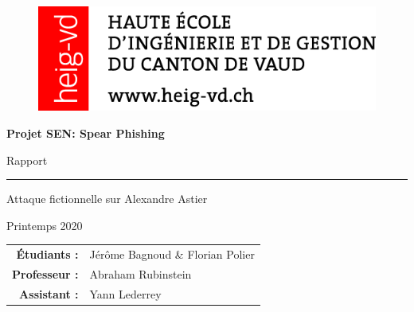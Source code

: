\documentclass{extarticle}
\begin{document}
    
    \begin{titlepage}
        \begin{center}

            \begin{figure}[H]
                \includegraphics[scale=0.7]{images/HEIG-VD_Logo96x29_RVB_ROUGE.png}
            \end{figure}
            \vspace{2cm}
            \Huge
            \textbf{Projet SEN: Spear Phishing}

            \vspace{0.4cm}
            \LARGE
            Rapport

            \rule{0.7\textwidth}{.5pt}

            \vspace{0.4cm}
            \Huge
            Attaque fictionnelle sur Alexandre Astier

            \vspace{0.5cm}
            \large
            Printemps 2020

            \vspace{6cm}

            \Large
            \begin{tabular}{r l}
                \textbf{Étudiants :} & Jérôme Bagnoud \& Florian Polier\\
                \textbf{Professeur :} & Abraham Rubinstein \\
                \textbf{Assistant :} & Yann Lederrey \\
            \end{tabular}
            
        \end{center}
    \end{titlepage}


    

    

    

    


    
\end{document}
